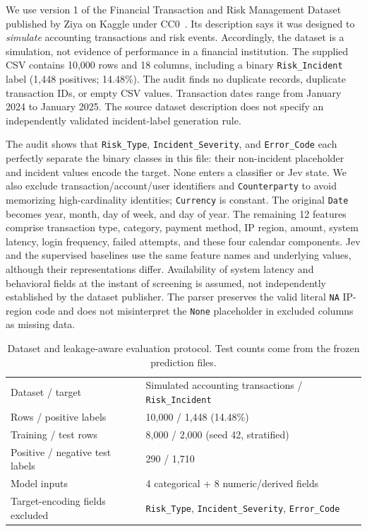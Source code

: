 \documentclass{llncs}
\begin{document}
We use version 1 of the Financial Transaction and Risk Management Dataset published by Ziya on Kaggle under CC0~\cite{ziya2025dataset}. Its description says it was designed to \emph{simulate} accounting transactions and risk events. Accordingly, the dataset is a simulation, not evidence of performance in a financial institution. The supplied CSV contains 10,000 rows and 18 columns, including a binary \texttt{Risk\_Incident} label (1,448 positives; 14.48\%). The audit finds no duplicate records, duplicate transaction IDs, or empty CSV values. Transaction dates range from January 2024 to January 2025. The source dataset description does not specify an independently validated incident-label generation rule.

The audit shows that \texttt{Risk\_Type}, \texttt{Incident\_Severity}, and \texttt{Error\_Code} each perfectly separate the binary classes in this file: their non-incident placeholder and incident values encode the target. None enters a classifier or Jev state. We also exclude transaction/account/user identifiers and \texttt{Counterparty} to avoid memorizing high-cardinality identities; \texttt{Currency} is constant. The original \texttt{Date} becomes year, month, day of week, and day of year. The remaining 12 features comprise transaction type, category, payment method, IP region, amount, system latency, login frequency, failed attempts, and these four calendar components. Jev and the supervised baselines use the same feature names and underlying values, although their representations differ. Availability of system latency and behavioral fields at the instant of screening is assumed, not independently established by the dataset publisher. The parser preserves the valid literal \texttt{NA} IP-region code and does not misinterpret the \texttt{None} placeholder in excluded columns as missing data.

\begin{table}[t]
\caption{Dataset and leakage-aware evaluation protocol. Test counts come from the frozen prediction files.}\label{tab:data}
\centering\small
\begin{tabular}{ll}
\hline
Dataset / target & Simulated accounting transactions / \texttt{Risk\_Incident} \\
Rows / positive labels & 10,000 / 1,448 (14.48\%) \\
Training / test rows & 8,000 / 2,000 (seed 42, stratified) \\
Positive / negative test labels & 290 / 1,710 \\
Model inputs & 4 categorical + 8 numeric/derived fields \\
Target-encoding fields excluded & \texttt{Risk\_Type}, \texttt{Incident\_Severity}, \texttt{Error\_Code} \\
\hline
\end{tabular}
\end{table}
\end{document}
